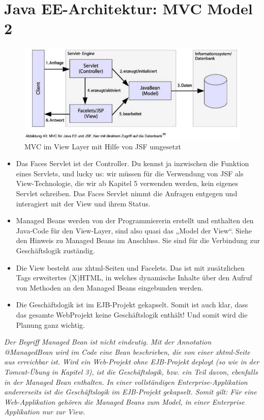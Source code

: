 \section{Java EE-Architektur: MVC Model 2}

\begin{figure}[h!]
\centering
\includegraphics[width=0.7\linewidth]{fig/tooling-mvc-im-view-layer}
\caption{MVC im View Layer mit Hilfe von JSF umgesetzt}
\label{fig:tooling-mvc-im-view-layer}
\end{figure}
\begin{itemize}
	\item Das Faces Servlet ist der Controller. Du kennst ja inzwischen die Funktion eines Servlets, und
	lucky us: wir müssen für die Verwendung von JSF als View-Technologie, die wir ab Kapitel 5
	verwenden werden, kein eigenes Servlet schreiben. Das Faces Servlet nimmt die Anfragen
	entgegen und interagiert mit der View und ihrem Status.
	\item Managed Beans werden von der Programmiererin erstellt und enthalten den Java-Code für den
	View-Layer, sind also quasi das „Model der View“. Siehe den Hinweis zu Managed Beans im
	Anschluss. Sie sind für die Verbindung zur Geschäftslogik zuständig.
	\item  Die View besteht aus xhtml-Seiten und Facelets. Das ist mit zusätzlichen Tags erweitertes
	(X)HTML, in welches dynamische Inhalte über den Aufruf von Methoden an den Managed Beans
	eingebunden werden.
	\item  Die Geschäftslogik ist im EJB-Projekt gekapselt. Somit ist auch klar, dass das gesamte WebProjekt
	keine Geschäftslogik enthält! Und somit wird die Planung ganz wichtig.
\end{itemize}

\emph{Der Begriff Managed Bean ist nicht eindeutig. Mit der Annotation @ManagedBean wird im Code eine Bean beschrieben, die von einer xhtml-Seite aus erreichbar ist. Wird ein Web-Projekt ohne	EJB-Projekt deployt (so wie in der Tomcat-Übung in Kapitel 3), ist die Geschäftslogik, bzw. ein Teil davon, ebenfalls in der Managed Bean enthalten. In einer vollständigen Enterprise-Applikation andererseits ist die Geschäftslogik im EJB-Projekt gekapselt. Somit gilt: Für eine Web-Applikation gehören die Managed Beans zum Model, in einer Enterprise Applikation nur zur View.}

